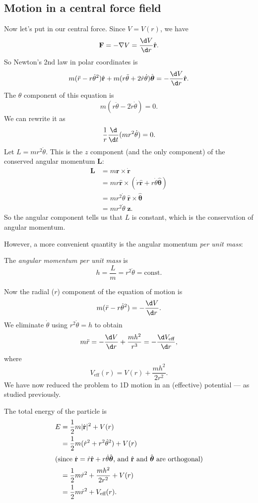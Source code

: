 \documentclass[a4paper]{article}
\begin{document}
\subsection{Motion in a central force field}
Now let's put in our central force. Since $V = V(r)$, we have
\[
  \mathbf{F} = -\nabla V = \frac{\d V}{\d r} \hat{\mathbf{r}}.
\]
So Newton's 2nd law in polar coordinates is
\[
  m(\ddot{r} - r\dot{\theta}^2)\hat{\mathbf{r}} + m(r\ddot{\theta} + 2\dot{r}\dot{\theta})\hat{\boldsymbol\theta} = -\frac{\d V}{\d r}\hat{\mathbf{r}}.
\]
The $\theta$ component of this equation is
\[
  m(r\ddot{\theta} - 2\dot{r}\dot{\theta}) = 0.
\]
We can rewrite it as
\[
  \frac{1}{r}\frac{\d }{\d t}(mr^2 \dot{\theta}) = 0.
\]
Let $L = mr^2 \dot{\theta}$. This is the $z$ component (and the only component) of the conserved angular momentum $\mathbf{L}$:
\begin{align*}
  \mathbf{L} &= m\mathbf{r}\times \dot{\mathbf{r}}\\
  &= mr\hat{\mathbf{r}}\times (\dot{r}\hat{\mathbf{r}} + r\dot{\theta}\hat{\boldsymbol\theta})\\
  &= mr^2 \dot{\theta}\; \hat{\mathbf{r}}\times \hat{\boldsymbol\theta}\\
  &= mr^2 \dot{\theta}\; \hat{\mathbf{z}}.
\end{align*}
So the angular component tells us that $L$ is constant, which is the conservation of angular momentum.

However, a more convenient quantity is the angular momentum \emph{per unit mass}:
\begin{notation}
  The \emph{angular momentum per unit mass} is
  \[
    h = \frac{L}{m} = r^2\dot\theta = \text{const.}
  \]
\end{notation}
Now the radial ($r$) component of the equation of motion is
\[
  m(\ddot{r} - r\dot{\theta}^2) = -\frac{\d V}{\d r}.
\]
We eliminate $\dot{\theta}$ using $r^2\dot{\theta} = h$ to obtain
\[
  m\ddot{r} = -\frac{\d V}{\d r} + \frac{mh^2}{r^3} = -\frac{\d V_{\text{eff}}}{\d r},
\]
where
\[
  V_{\text{eff}}(r) = V(r) + \frac{mh^2}{2r^2}.
\]
We have now reduced the problem to 1D motion in an (effective) potential --- as studied previously.

The total energy of the particle is
\begin{align*}
  E &= \frac{1}{2}m|\dot{\mathbf{r}}|^2 + V(r)\\
  &= \frac{1}{2}m(\dot{r}^2 + r^2\dot{\theta}^2) + V(r)\\
  \intertext{(since $\dot{\mathbf{r}} = \dot{r}\hat{\mathbf{r}} + r\dot{\theta}\hat{\boldsymbol\theta}$, and $\hat{\mathbf{r}}$ and $\hat{\boldsymbol\theta}$ are orthogonal)}
  &= \frac{1}{2}m\dot{r}^2 + \frac{mh^2}{2r^2} + V(r)\\
  &= \frac{1}{2}m\dot{r}^2 + V_{\text{eff}}(r).
\end{align*}
\end{document}
